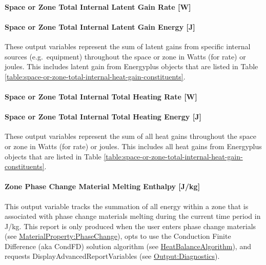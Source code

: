 \paragraph{Space or Zone Total Internal Latent Gain Rate {[}W{]}}\label{zone-total-internal-latent-gain-rate-w}

\paragraph{Space or Zone Total Internal Latent Gain Energy {[}J{]}}\label{zone-total-internal-latent-gain-energy-j}

These output variables represent the sum of latent gains from specific internal sources (e.g.~equipment) throughout the space or zone in Watts (for rate) or joules. This includes latent gain from Energyplus objects that are listed in Table \ref{table:space-or-zone-total-internal-heat-gain-constituents}.

\paragraph{Space or Zone Total Internal Total Heating Rate {[}W{]}}\label{zone-total-internal-total-heating-rate-w}

\paragraph{Space or Zone Total Internal Total Heating Energy {[}J{]}}\label{zone-total-internal-total-heating-energy-j}

These output variables represent the sum of all heat gains throughout the space or zone in Watts (for rate) or joules. This includes all heat gains from Energyplus objects that are listed in Table \ref{table:space-or-zone-total-internal-heat-gain-constituents}.

\paragraph{Zone Phase Change Material Melting Enthalpy {[}J/kg{]}}\label{zone-phase-change-material-melting-enthalpy-jkg}

This output variable tracks the summation of all energy within a zone that is associated with phase change materials melting during the current time period in J/kg.  This report is only produced when the user enters phase change materials (see \hyperref[materialpropertyphasechange]{MaterialProperty:PhaseChange}), opts to use the Conduction Finite Difference (aka CondFD) solution algorithm (see \hyperref[heatbalancealgorithm]{HeatBalanceAlgorithm}), and requests DisplayAdvancedReportVariables (see \hyperref[outputdiagnostics]{Output:Diagnostics}).

